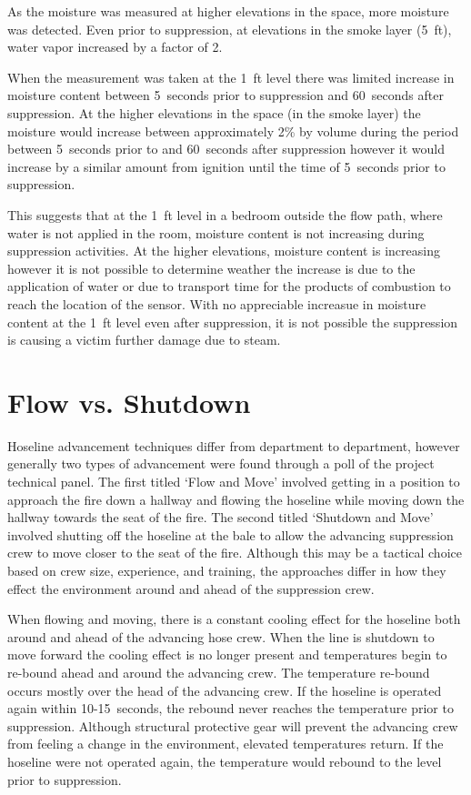 \documentclass[12pt,oneside]{book}
\begin{document}
As the moisture was measured at higher elevations in the space, more moisture was detected. Even prior to suppression, at elevations in the smoke layer (5~ft), water vapor increased by a factor of 2. 

When the measurement was taken at the 1~ft level there was limited increase in moisture content between 5~seconds prior to suppression and 60~seconds after suppression. At the higher elevations in the space (in the smoke layer) the moisture would increase between approximately 2\% by volume during the period between 5~seconds prior to and 60~seconds after suppression however it would increase by a similar amount from ignition until the time of 5~seconds prior to suppression. 

This suggests that at the 1~ft level in a bedroom outside the flow path, where water is not applied in the room, moisture content is not increasing during suppression activities. At the higher elevations, moisture content is increasing however it is not possible to determine weather the increase is due to the application of water or due to transport time for the products of combustion to reach the location of the sensor. With no appreciable increasue in moisture content at the 1~ft level even after suppression, it is not possible the suppression is causing a victim further damage due to steam. 

\section{Flow vs. Shutdown} \label{tc:flow_vs_shutdown}
Hoseline advancement techniques differ from department to department, however generally two types of advancement were found through a poll of the project technical panel. The first titled `Flow and Move' involved getting in a position to approach the fire down a hallway and flowing the hoseline while moving down the hallway towards the seat of the fire. The second titled `Shutdown and Move' involved shutting off the hoseline at the bale to allow the advancing suppression crew to move closer to the seat of the fire. Although this may be a tactical choice based on crew size, experience, and training, the approaches differ in how they effect the environment around and ahead of the suppression crew. 

When flowing and moving, there is a constant cooling effect for the hoseline both around and ahead of the advancing hose crew. When the line is shutdown to move forward the cooling effect is no longer present and temperatures begin to re-bound ahead and around the advancing crew. The temperature re-bound occurs mostly over the head of the advancing crew. If the hoseline is operated again within 10-15~seconds, the rebound never reaches the temperature prior to suppression. Although structural protective gear will prevent the advancing crew from feeling a change in the environment, elevated temperatures return. If the hoseline were not operated again, the temperature would rebound to the level prior to suppression.
\end{document}
